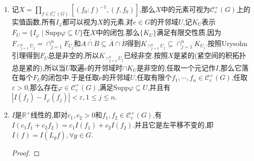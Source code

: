 \begin{enumerate}
\begin{proof}
    	局部紧Hausdorff空间上有Urysohn引理,于是可取$g\in\mathscr{C}_c^+(G)$,使得它在$\mathrm{Supp}(f_1+f_2)=\mathrm{Supp}f_1\cup\mathrm{Supp}f_2$(闭包和有限并可交换)上恒取1.设$\delta>0$,取$h=f_1+f_2+\delta g$,这是一个连续函数.取$h_i=f_i/h,i=1,2$,约定$h_i$在$\mathrm{Supp}f_i$以外恒取零.那么$h_i\in\mathscr{C}_c^+$.按照我们证明的$\mathscr{C}_c$具有左和右一致连续性,可取$e$的开邻域$U_{\delta}$,使得只要$t^{-1}s\in U_{\delta}$,就有$|h_i(s)-h_i(t)|<\delta,i=1,2$.
    	
    	\qquad
    	
    	设$\mathrm{Supp}\varphi\subseteq U$,并设$h\le\sum_jc_jL_{s_j}\varphi$,那么$f_i(s)=h(s)h_i(s)\le\sum_jc_j\varphi(s_j^{-1}s)h_i(s)\le\sum_jc_j\varphi(s_j^{-1}s)(h_i(s_j)+\delta)$.于是得到$(f_i:\varphi)\le\sum_jc_j(h_i(s_j)+\delta)$.按照$h_1+h_2\le1$,得到$(f_1:\varphi)+(f_2:\varphi)\le(1+2\delta)\sum_jc_j$,取下确界得到$(f_1:\varphi)+(f_2:\varphi)\le(1+2\delta)(h:\varphi)$,于是有:
    	\begin{align*}
    		I_{\varphi}(f_1)+I_{\varphi}(f_2)&\le(1+2\delta)I_{\varphi}(h)\\&\le(1+2\delta)\left(I_{\varphi}(f_1+f_2)+\delta I_{\varphi}(g)\right)\\&=I_{\varphi}(f_1+f_2)+2\delta\left(I_{\varphi}(f_1+f_2)+\delta I_{\varphi}(g)\right)
    	\end{align*}
    
        我们之前给出过$I_{\varphi}(f)\le(f:f_0)$所以$I_{\varphi}(f_1+f_2)$和$I_{\varphi}(g)$的上界不依赖$\varphi$,所以适当选取足够小的$\delta$,取$V=U_{\delta}$,那么当$\varphi$的支集落在$V$中时就有$I_{\varphi}(f_1)+I_{\varphi}(f_2)\le I_{\varphi}(f_1+f_2)+\varepsilon$.
    \end{proof}
    \item 记$X=\prod_{f\in\mathscr{C}_c^+(G)}[(f_0:f)^{-1},(f,f_0)]$,那么$X$中的元素可视为$\mathscr{C}_c^+(G)$上的实值函数,所有$I_{\varphi}$都可以视为$X$的元素.对$e\in G$的开邻域$U$,记$K_U$表示$F_U=\{I_{\varphi}\mid\mathrm{Supp}\varphi\subseteq U\}$在$X$中的闭包.那么$\{K_U\}$满足有限交性质,因为$F_{\cap_{j=1}^nU_j}=\cap_{j=1}^nF_{U_j}$和$\overline{A\cap B}\subseteq\overline{A}\cap\overline{B}$得到$K_{\cap_{j=1}^nU_j}\subseteq\cap_{j=1}^nK_{U_j}$.按照Urysohn引理得到$F_U$总是非空的,所以$K_{\cap_{j=1}^nU_j}$已经非空.按照$X$是紧的(紧空间的积拓扑总是紧的),所以当$U$取遍$e$的开邻域时$\cap K_U$是非空的,任取一个元记作$I$,那么它落在每个$F_U$的闭包中.于是任取$e$的开邻域$U$,任取有限个$f_1,\cdots,f_n\in\mathscr{C}_c^+(G)$,任取$\varepsilon>0$,那么存在$\varphi\in\mathscr{C}_c^+(G)$,满足$\mathrm{Supp}\varphi\subseteq U$,并且有$|I(f_j)-I_{\varphi}(f_j)|<\varepsilon,1\le j\le n$.
    \item $I$是$\mathbb{R}^+$线性的,即对$c_1,c_2>0$和$f_1,f_2\in\mathscr{C}_c^+(G)$,有$I(c_1f_1+c_2f_2)=c_1I(f_1)+c_2I(f_2)$.并且它是左平移不变的,即$I(f)=I(L_gf),\forall g\in G$.
    \begin{proof}
    	

\end{proof}
\end{enumerate}
